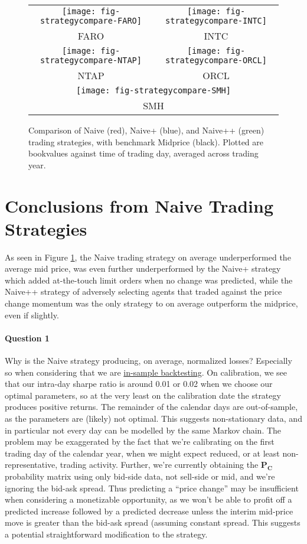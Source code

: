 \documentclass[12pt]{article}
\newcommand\mat[1]{\boldsymbol{#1}}
\begin{document}
\begin{figure}[h]
  \centering
  \begin{tabular}{cc}
  	\texttt{[image: fig-strategycompare-FARO]} & \texttt{[image: fig-strategycompare-INTC]} \\
  	FARO & INTC \\
  	\texttt{[image: fig-strategycompare-NTAP]} & \texttt{[image: fig-strategycompare-ORCL]} \\
  	  	NTAP & ORCL \\
    \multicolumn{2}{c}{\texttt{[image: fig-strategycompare-SMH]} }\\
    \multicolumn{2}{c}{SMH}  	
  \end{tabular}
  \caption{Comparison of Naive (red), Naive+ (blue), and Naive++ (green) trading strategies, with benchmark Midprice (black). Plotted are bookvalues against time of trading day, averaged across trading year.}
  \label{fig:comp}
\end{figure}

\section*{Conclusions from Naive Trading Strategies}

As seen in Figure \ref{fig:comp}, the Naive trading strategy on average underperformed the average mid price, was even further underperformed by the Naive+ strategy which added at-the-touch limit orders when no change was predicted, while the Naive++ strategy of adversely selecting agents that traded against the price change momentum was the only strategy to on average outperform the midprice, even if slightly. 

\paragraph{Question 1} Why is the Naive strategy producing, on average, normalized losses? Especially so when considering that we are \underline{in-sample backtesting}. On calibration, we see that our intra-day sharpe ratio is around 0.01 or 0.02 when we choose our optimal parameters, so at the very least on the calibration date the strategy produces positive returns. The remainder of the calendar days are out-of-sample, as the parameters are (likely) not optimal. This suggests non-stationary data, and in particular not every day can be modelled by the same Markov chain. The problem may be exaggerated by the fact that we're calibrating on the first trading day of the calendar year, when we might expect reduced, or at least non-representative, trading activity. Further, we're currently obtaining the $\mat{P_C}$ probability matrix using only bid-side data, not sell-side or mid, and we're ignoring the bid-ask spread. Thus predicting a ``price change'' may be insufficient when considering a monetizable opportunity, as we won't be able to profit off a predicted increase followed by a predicted decrease unless the interim mid-price move is greater than the bid-ask spread (assuming constant spread. This suggests a potential straightforward modification to the strategy.
\end{document}
